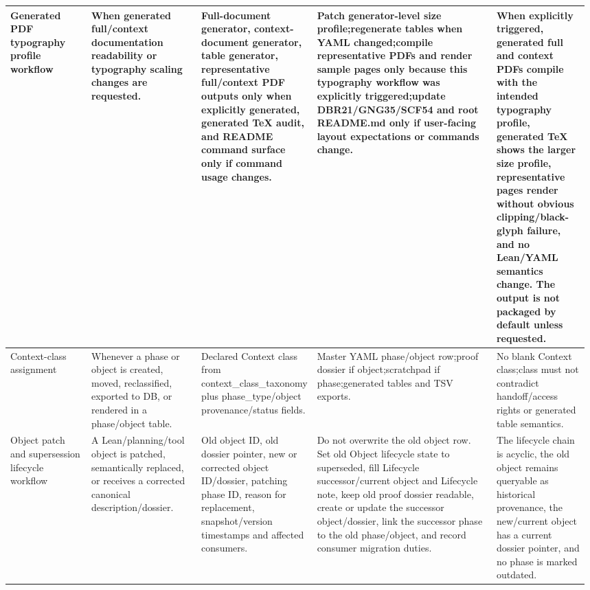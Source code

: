 \begin{longtable}{L{0.14\linewidth} L{0.19\linewidth} L{0.18\linewidth} L{0.31\linewidth} L{0.16\linewidth}}
Generated PDF typography profile workflow & When generated full/\allowbreak{}context documentation readability or typography scaling changes are requested. & Full-document generator, context-document generator, table generator, representative full/\allowbreak{}context PDF outputs only when explicitly generated, generated TeX audit, and README command surface only if command usage changes. & Patch generator-level size profile;\newline regenerate tables when YAML changed;\newline compile representative PDFs and render sample pages only because this typography workflow was explicitly triggered;\newline update DBR21/\allowbreak{}GNG35/\allowbreak{}SCF54 and root README.md only if user-facing layout expectations or commands change. & When explicitly triggered, generated full and context PDFs compile with the intended typography profile, generated TeX shows the larger size profile, representative pages render without obvious clipping/\allowbreak{}black-glyph failure, and no Lean/\allowbreak{}YAML semantics change. The output is not packaged by default unless requested.\\
\hline
\addlinespace[0.24em]
Context-class assignment & Whenever a phase or object is created, moved, reclassified, exported to DB, or rendered in a phase/\allowbreak{}object table. & Declared Context class from context\_class\_taxonomy plus phase\_type/\allowbreak{}object provenance/\allowbreak{}status fields. & Master YAML phase/\allowbreak{}object row;\newline proof dossier if object;\newline scratchpad if phase;\newline generated tables and TSV exports. & No blank Context class;\newline class must not contradict handoff/\allowbreak{}access rights or generated table semantics.\\
\hline
\addlinespace[0.24em]
Object patch and supersession lifecycle workflow & A Lean/\allowbreak{}planning/\allowbreak{}tool object is patched, semantically replaced, or receives a corrected canonical description/\allowbreak{}dossier. & Old object ID, old dossier pointer, new or corrected object ID/\allowbreak{}dossier, patching phase ID, reason for replacement, snapshot/\allowbreak{}version timestamps and affected consumers. & Do not overwrite the old object row. Set old Object lifecycle state to superseded, fill Lifecycle successor/\allowbreak{}current object and Lifecycle note, keep old proof dossier readable, create or update the successor object/\allowbreak{}dossier, link the successor phase to the old phase/\allowbreak{}object, and record consumer migration duties. & The lifecycle chain is acyclic, the old object remains queryable as historical provenance, the new/\allowbreak{}current object has a current dossier pointer, and no phase is marked outdated.\\

\end{longtable}
